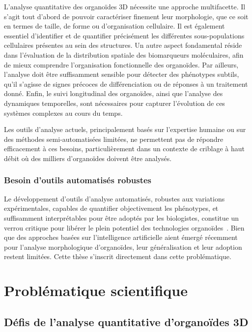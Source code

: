 L'analyse quantitative des organoïdes 3D nécessite une approche multifacette. Il s'agit tout d'abord de pouvoir caractériser finement leur morphologie, que ce soit en termes de taille, de forme ou d'organisation cellulaire. Il est également essentiel d'identifier et de quantifier précisément les différentes sous-populations cellulaires présentes au sein des structures. Un autre aspect fondamental réside dans l'évaluation de la distribution spatiale des biomarqueurs moléculaires, afin de mieux comprendre l'organisation fonctionnelle des organoïdes. Par ailleurs, l'analyse doit être suffisamment sensible pour détecter des phénotypes subtils, qu'il s'agisse de signes précoces de différenciation ou de réponses à un traitement donné. Enfin, le suivi longitudinal des organoïdes, ainsi que l'analyse des dynamiques temporelles, sont nécessaires pour capturer l'évolution de ces systèmes complexes au cours du temps.

Les outils d'analyse actuels, principalement basés sur l'expertise humaine ou sur des méthodes semi-automatisées limitées, ne permettent pas de répondre efficacement à ces besoins, particulièrement dans un contexte de criblage à haut débit où des milliers d'organoïdes doivent être analysés.

\subsubsection{Besoin d'outils automatisés robustes}

Le développement d'outils d'analyse automatisés, robustes aux variations expérimentales, capables de quantifier objectivement les phénotypes, et suffisamment interprétables pour être adoptés par les biologistes, constitue un verrou critique pour libérer le plein potentiel des technologies organoïdes~\cite{Bai2023,Du2023}. Bien que des approches basées sur l'intelligence artificielle aient émergé récemment pour l'analyse morphologique d'organoïdes, leur généralisation et leur adoption restent limitées. Cette thèse s'inscrit directement dans cette problématique.

\section{Problématique scientifique}

\subsection{Défis de l'analyse quantitative d'organoïdes 3D}

